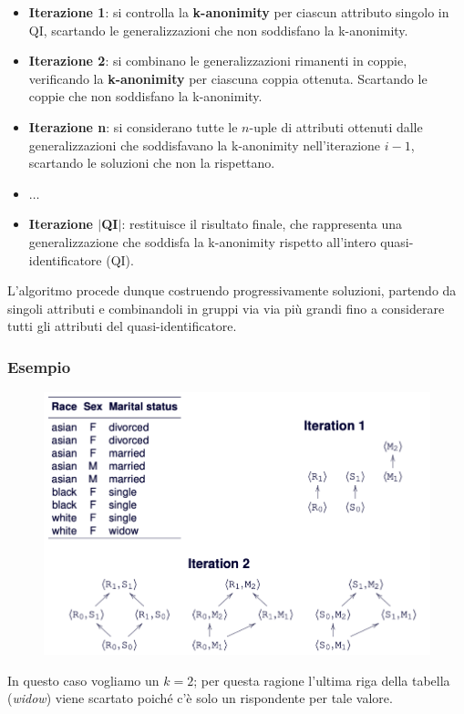 \documentclass{report}
\begin{document}
\begin{itemize}
    \item \textbf{Iterazione 1}: si controlla la \textbf{k-anonimity} per ciascun attributo singolo in QI, scartando le generalizzazioni che non soddisfano la k-anonimity.
    \item \textbf{Iterazione 2}: si combinano le generalizzazioni rimanenti in coppie, verificando la \textbf{k-anonimity} per ciascuna coppia ottenuta. Scartando le coppie che non soddisfano la k-anonimity.
    \item \textbf{Iterazione n}: si considerano tutte le $n$-uple di attributi ottenuti dalle generalizzazioni che soddisfavano la k-anonimity nell'iterazione $i-1$, scartando le soluzioni che non la rispettano.
    \item $\ldots$
    \item \textbf{Iterazione $|$QI$|$}: restituisce il risultato finale, che rappresenta una generalizzazione che soddisfa la k-anonimity rispetto all'intero quasi-identificatore (QI).
\end{itemize}

\noindent L'algoritmo procede dunque costruendo progressivamente soluzioni, partendo da singoli attributi e combinandoli in gruppi via via più grandi fino a considerare tutti gli attributi del quasi-identificatore.

\newpage
\subsubsection{Esempio}
\begin{figure}[ht]
    \centering
    \includegraphics[width=1\linewidth]{images/incognito.png}
\end{figure}
In questo caso vogliamo un $k=2$; per questa ragione l'ultima riga della tabella 
(\textit{widow}) viene scartato poiché c'è solo un rispondente per tale valore.
\end{document}
